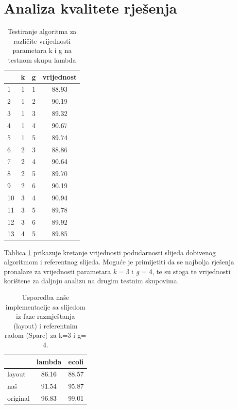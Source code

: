 \documentclass[times, utf8, seminar, numeric]{fer}
\begin{document}
\section{Analiza kvalitete rješenja}
\begin{table}[htb]
	\centering
	\begin{tabular}{l|ccc}
		& \multicolumn{1}{l}{k} &g 		&vrijednost\\ 	\hline
		 	1			&1	 	&1 		& 88.93 \\ 		\hline
		 	2			&1	 	&2		& 90.19 \\ 		\hline
		 	3			&1	 	&3 		& 89.32 \\ 		\hline
		 	4			&1	 	&4 		& 90.67 \\ 		\hline
		 	5			&1	 	&5 		& 89.74 \\ 		\hline
		 	6			&2	 	&3 		& 88.86 \\ 		\hline
		 	7			&2	 	&4		& 90.64 \\ 		\hline
		 	8			&2	 	&5		& 89.70 \\ 		\hline
		 	9			&2	 	&6 		& 90.19 \\ 		\hline
		 	10			&3	 	&4 		& 90.94 \\ 		\hline
		 	11			&3	 	&5 		& 89.78 \\ 		\hline
		 	12			&3	 	&6 		& 89.92 \\ 		\hline
		 	13			&4	 	&5 		& 89.85 \\ 		\hline
	\end{tabular}
	\caption{Testiranje algoritma za različite vrijednosti parametara k i g na testnom skupu lambda}
	\label{table:lambda_test}
\end{table}

Tablica \ref{table:lambda_test} prikazuje kretanje vrijednosti podudarnosti slijeda dobivenog algoritmom i referentnog slijeda. Moguće je primijetiti da se najbolja rješenja pronalaze za vrijednosti parametara \emph{k} = 3 i \emph{g} = 4, te su stoga te vrijednosti korištene za daljnju analizu na drugim testnim skupovima.

\begin{table}[htb]
	\centering
	\begin{tabular}{l|cc}
		& \multicolumn{1}{l}{lambda} & ecoli \\ 	\hline
		layout 					& 86.16 	& 88.57 \\ 	\hline
		naš  					& 91.54     & 95.87 \\	\hline
		original		   		& 96.83 	& 99.01 \\ 
	\end{tabular}
	\caption{Usporedba naše implementacije sa slijedom iz faze razmještanja (layout) i referentnim radom (Sparc) za k=3 i g= 4.}
	\label{table:kvaliteta}
\end{table}
\end{document}
